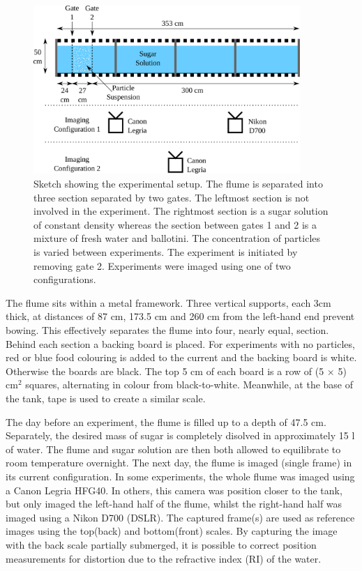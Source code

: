 \documentclass[authoryear,preprint,review,12pt]{elsarticle}
\begin{document}
\begin{figure}[ht!]
  \centerline{\includegraphics[width=0.9\textwidth]{setup.pdf}}
  \caption{Sketch showing the experimental setup. The flume is separated into three section separated by two gates. The leftmost section is not involved in the experiment. The rightmost section is a sugar solution of constant density whereas the section between gates 1 and 2 is a mixture of fresh water and ballotini. The concentration of particles is varied between experiments. The experiment is initiated by removing gate 2. Experiments were imaged using one of two configurations. }
  \label{fig:setup}
\end{figure}

The flume sits within a metal framework. Three vertical supports, each 3cm thick, at distances of 87 cm, 173.5 cm and 260 cm from the left-hand end prevent bowing. This effectively separates the flume into four, nearly equal, section. Behind each section a backing board is placed. For experiments with no particles, red or blue food colouring is added to the current and the backing board is white. Otherwise the boards are black. The top 5 cm of each board is a row of (5 $\times$ 5) cm$^{2}$ squares, alternating in colour from black-to-white. Meanwhile, at the base of the tank, tape is used to create a similar scale.

The day before an experiment, the flume is filled up to a depth of 47.5 cm. Separately, the desired mass of sugar is completely disolved in approximately 15 l of water. The flume and sugar solution are then both allowed to equilibrate to room temperature overnight. The next day, the flume is imaged (single frame) in its current configuration. In some experiments, the whole flume was imaged using a Canon Legria HFG40. In others, this camera was position closer to the tank, but only imaged the left-hand half of the flume, whilst the right-hand half was imaged using a Nikon D700 (DSLR). The captured frame(s) are used as reference images using the top(back) and bottom(front) scales. By capturing the image with the back scale partially submerged, it is possible to correct position measurements for distortion due to the refractive index (RI) of the water.
\end{document}
